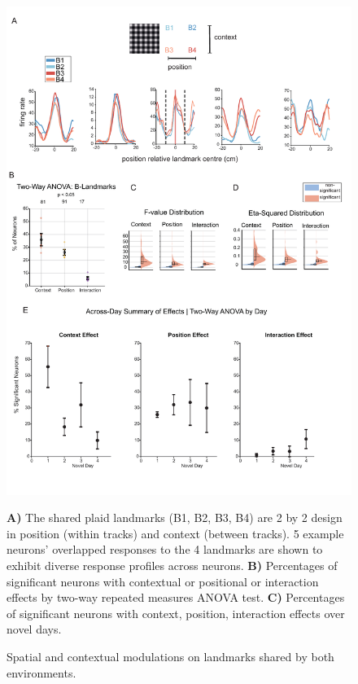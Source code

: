 \begin{figure}
    \centering
    \includegraphics[width=1\linewidth]{figures//Chapter 4 V1/fig4_spatial_modulation_tests.pdf}
    \caption{Spatial and contextual modulations on landmarks shared by both environments. }
\medskip
\small
\textbf{A)} The shared plaid landmarks (B1, B2, B3, B4) are 2 by 2 design in position (within tracks) and context (between tracks). 5 example neurons' overlapped responses to the 4 landmarks are shown to exhibit diverse response profiles across neurons. \textbf{B)} Percentages of significant neurons with contextual or positional or interaction effects by two-way repeated measures ANOVA test. \textbf{C)} Percentages of significant neurons with context, position, interaction effects over novel days. 
    \label{fig:placeholder}
\end{figure}


